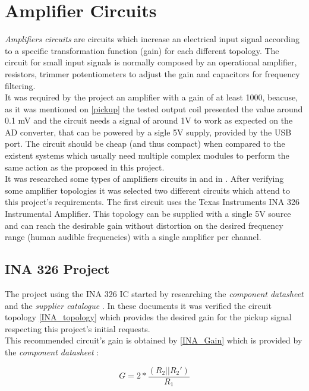 \section{Amplifier Circuits}
\textit{Amplifiers circuits} \cite{amplifier-circuit} are circuits which increase
an electrical input signal according to a specific transformation function (gain)
for each different topology. The circuit for small input signals is normally
composed by an operational amplifier, resistors, trimmer potentiometers to adjust
the gain and capacitors for frequency filtering.\\
It was required by the project an amplifier with a gain of at least 1000, beacuse, as it was
mentioned on \autoref{pickup} the tested output coil presented the value around 0.1 mV and the
circuit needs a signal of around 1V to work as expected on the AD converter, that can be powered by a sigle 5V supply, provided by the USB port. The circuit
should be cheap (and thus compact) when compared to the existent systems which usually need
multiple complex modules to perform the same action as the proposed in this project. \\
It was researched some types of amplifiers circuits in 
and in . After verifying some amplifier topologies it was
selected two different circuits which attend to this project's requirements.
The first circuit uses the Texas Instruments INA 326 Instrumental Amplifier.%
This topology
can be supplied with a single 5V source and can reach the desirable gain without
distortion on the desired frequency range (human audible frequencies) with a single
amplifier per channel.\\

\subsection{INA 326 Project}
The project using the INA 326 IC started by researching the \textit{component datasheet}
\cite{INA326} and the \textit{supplier catalogue} \cite{OpAmps}. In these documents
it was verified the circuit topology \autoref{INA_topology} which provides the
desired gain for the pickup signal respecting this project's initial requests.\\
This recommended circuit's gain is obtained by \autoref{INA_Gain} which is
provided by the \textit{component datasheet} \cite{INA326}:

\begin{equation}
  \label{INA_Gain}
  G=2*\frac{(R_2||R_2 ')}{R_1}
\end{equation}

